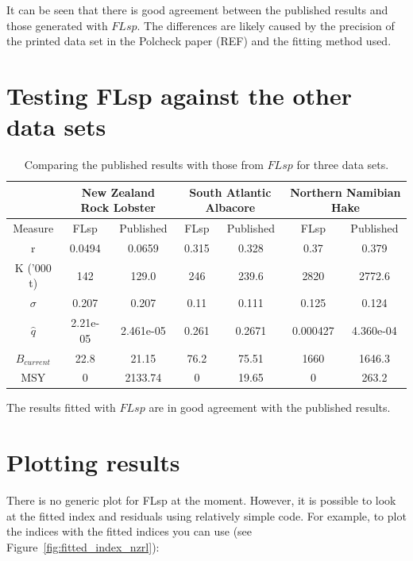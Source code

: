 \documentclass[a4paper]{article}
\begin{document}
It can be seen that there is good agreement between the published results and those generated with $FLsp$. The differences are likely caused by the precision of the printed data set in the Polcheck paper (REF) and the fitting method used.

\section{Testing FLsp against the other data sets}



\begin{table}
\begin{tabular}{|c|c|c|c|c|c|c|}
\hline
& \multicolumn{2}{|c|}{New Zealand Rock Lobster}
& \multicolumn{2}{|c|}{South Atlantic Albacore}
& \multicolumn{2}{|c|}{Northern Namibian Hake} \\
\hline
Measure & FLsp & Published & FLsp & Published & FLsp & Published \\
\hline
r          & 0.0494     & 0.0659    &  0.315     & 0.328 & 0.37     & 0.379     \\
K ('000 t) & 142     & 129.0     &  246     & 239.6  & 2820     & 2772.6    \\
$\sigma$   & 0.207 & 0.207     &  0.11 & 0.111  & 0.125 & 0.124     \\
$\hat{q}$  & 2.21e-05  & 2.461e-05 &  0.261  & 0.2671 & 0.000427  & 4.360e-04 \\
$B_{current}$  & 22.8  & 21.15 &  76.2  & 75.51 & 1660  & 1646.3 \\
MSY        &  0 & 2133.74 &  0  & 19.65 & 0  & 263.2 \\
\hline
\end{tabular}
\caption{Comparing the published results with those from $FLsp$ for three data sets.}
\label{tab:compare3datasets}
\end{table}

The results fitted with $FLsp$ are in good agreement with the published results.

\section{Plotting results}
There is no generic plot for FLsp at the moment. However, it is possible to look at the fitted index and residuals using relatively simple code. For example, to plot the indices with the fitted indices you can use (see Figure~\ref{fig:fitted_index_nzrl}):
\end{document}

